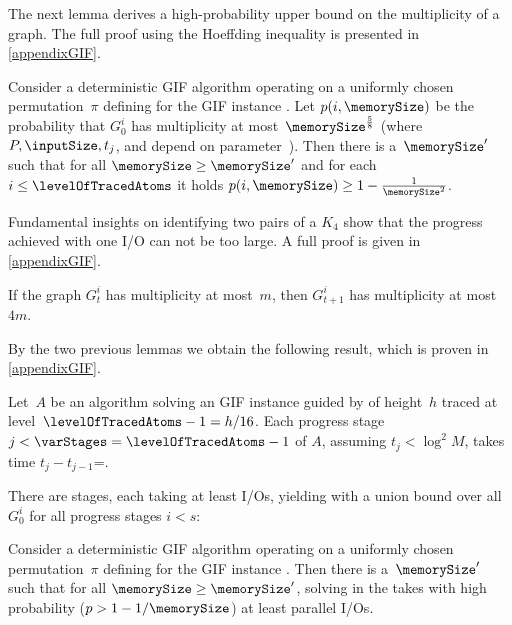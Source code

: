 \documentclass[envcountsame]{llncs}
\def\bO#1{\printmath{\mathcal{O}\left(#1\right)}}
\def\bOm#1{\printmath{\Omega \left(#1\right)}}
\begin{document}

The next lemma derives a high-probability upper bound on the multiplicity of a graph. 
The full proof using the Hoeffding inequality is presented in \autoref{appendixGIF}.

\begin{lemma}\label{lemmaMultiplicity}
Consider a deterministic GIF algorithm operating on a uniformly chosen permutation~$\pi$ defining \binaryTreeOf{\gifInstance} for the GIF instance \gifInstance. 
	Let $p(i,\memorySize)$ be the probability that $G^i_0$ has multiplicity at most~$\memorySize^{\frac{5}{8}}$ (where $P,\inputSize,t_j$, and \levelOfTracedAtoms  depend on parameter~\memorySize).
	Then there is a~$\memorySize^\prime$ such that for all $\memorySize\geq \memorySize^\prime$ and for each~$i \leq \levelOfTracedAtoms$ it holds $p(i,\memorySize) \geq  1-\frac{1}{\memorySize^2}$.
\end{lemma}

Fundamental insights on identifying two pairs of a $K_4$ show that the progress achieved with one I/O can not be too large.
A full proof is given in \autoref{appendixGIF}.

\begin{lemma}\label{lemmaQuadruple}
  If the graph $G^i_t$ has multiplicity at most~$m$, then $G^i_{t+1}$ has multiplicity at most~$4m$.
\end{lemma}

By the two previous lemmas we obtain the following result, which is proven in \autoref{appendixGIF}.

\begin{lemma}
	\label{lemmaGIFProgress}
  Let~$A$ be an algorithm solving an GIF instance \gifInstance guided by \binaryTreeOf{\gifInstance} of height~$h$ traced at level~$\levelOfTracedAtoms -1=h/16$.
  Each progress stage $j<\varStages=\levelOfTracedAtoms-1$ of $A$, assuming $t_j<\log^2 M$, takes time $t_j-t_{j-1}$=\bOm{\log M}.
\end{lemma}

There are \bO{\log\inputSize} stages, each taking at least \bOm{\log\inputSize} I/Os, yielding with a union bound over all $G^i_0$ for all progress stages $i<s$:

\begin{lemma}
	Consider a deterministic GIF algorithm operating on a uniformly chosen permutation~$\pi$ defining \binaryTreeOf{\gifInstance} for the GIF instance \gifInstance. 
	Then there is a~$\memorySize^\prime$ such that for all $\memorySize\geq \memorySize^\prime$, solving \gifInstance in the \fusePEM takes with high probability ($p>1-1/\memorySize$) at least \bOm{\log^2 \inputSize} parallel I/Os.
\end{lemma}
\end{document}
